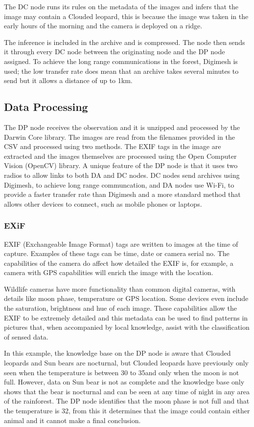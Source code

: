 			The DC node runs its rules on the metadata of the images and infers that the image may contain a Clouded leopard, this is because the image was taken in the early hours of the morning and the camera is deployed on a ridge.
			
			The inference is included in the archive and is compressed. The node then sends it through every DC node between the originating node and the DP node assigned. To achieve the long range communications in the forest, Digimesh is used; the low transfer rate does mean that an archive takes several minutes to send but it allows a distance of up to 1km.

	\subsection{Data Processing}			
			The DP node receives the observation and it is unzipped and processed by the Darwin Core library. The images are read from the filenames provided in the CSV and processed using two methods. The EXIF tags in the image are extracted and the images themselves are processed using the Open Computer Vision (OpenCV) library. A unique feature of the DP node is that it uses two radios to allow links to both DA and DC nodes. DC nodes send archives using Digimesh, to achieve long range communcation, and DA nodes use Wi-Fi, to provide a faster transfer rate than Digimesh and a more standard method that allows other devices to connect, such as mobile phones or laptops.
			
		\subsubsection{EXiF}
			EXIF (Exchangeable Image Format) tags are written to images at the time of capture. Examples of these tags can be time, date or camera serial no. The capabilities of the camera do affect how detailed the EXIF is, for example, a camera with GPS capabilities will enrich the image with the location. 
			
			Wildlife cameras have more functionality than common digital cameras, with details like moon phase, temperature or GPS location. Some devices even include the saturation, brightness and hue of each image. These capabilities allow the EXIF to be extremely detailed and this metadata can be used to find patterns in pictures that, when accompanied by local knowledge, assist with the classification of sensed data. 
			
			In this example, the knowledge base on the DP node is aware that Clouded leopards and Sun bears are nocturnal, but Clouded leopards have previously only seen when the temperature is between 30 to 35\celsius and only when the moon is not full. However, data on Sun bear is not as complete and the knowledge base only shows that the bear is nocturnal and can be seen at any time of night in any area of the rainforest. The DP node identifies that the moon phase is not full and that the temperature is 32\celsius, from this it determines that the image could contain either animal and it cannot make a final conclusion.
			
